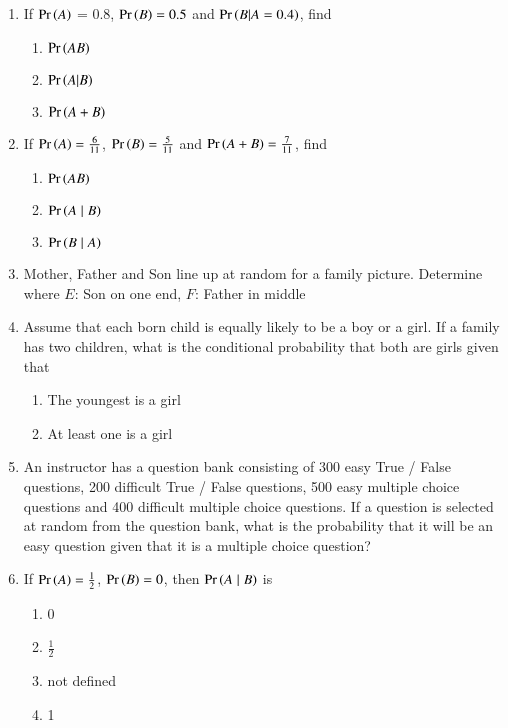\begin{enumerate}[label=\thechapter.\arabic*,ref=\thechapter.\theenumi]
	\item If $\Pr\left(A\right)$ = 0.8, $\Pr\left(B\right) = 0.5$ and $\Pr\left(B \vert A = 0.4\right)$, find  
\begin{enumerate}
\item
$\Pr\left(AB\right)$ 
\item
 $\Pr\left(A \vert B\right)$
\item
 $\Pr\left(A+B\right)$
\end{enumerate}
\solution
%
	\item If $\Pr\left(A\right)=\frac{6}{11}$, $\Pr\left(B\right)=\frac{5}{11}$ and $\Pr\left(A+B\right)=\frac{7}{11}$, find
\begin{enumerate}
	\item $\Pr\left(AB\right)$   
	\item $\Pr\left(A \mid B\right)$
	\item $\Pr\left(B \mid A\right)$
\end{enumerate}
\solution
		
\item Mother, Father and Son line up at random for a family picture. Determine  where 
$E$: Son on one end, $F$: Father in middle\\
\solution
		
	\item Assume that each born child is equally likely to be a boy or a girl. If a family has
two children, what is the conditional probability that both are girls given that
\begin{enumerate}
	\item  The youngest is a girl
	\item  At least one is a girl
\end{enumerate}
\solution
		
	\item An instructor has a question bank consisting of 300 easy True / False questions,
200 difficult True / False questions, 500 easy multiple choice questions and 400
difficult multiple choice questions. If a question is selected at random from the
question bank, what is the probability that it will be an easy question given that it
is a multiple choice question?
\\
\solution
		
\item If $ \Pr\left(A\right)  = \frac{1}{2}$, $\Pr\left(B\right) = 0$, then $\Pr\left(A \mid B\right)$ is
\begin{enumerate}
\item 0
\item $\frac{1}{2}$
\item not defined
\item 1
\end{enumerate}

\end{enumerate}
